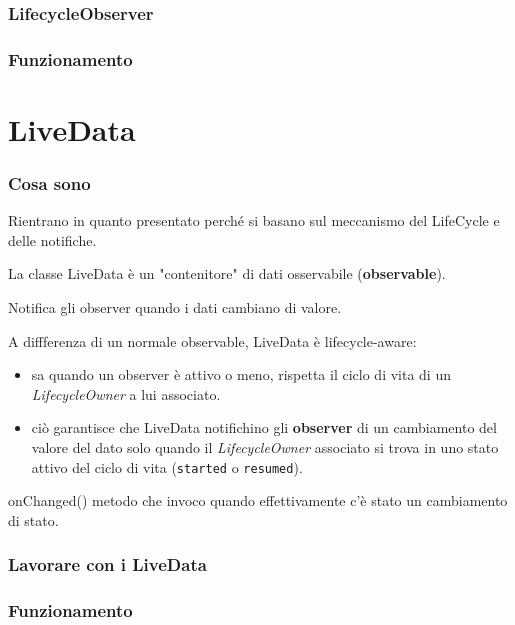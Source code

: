 \subsubsection{LifecycleObserver}

\subsubsection{Funzionamento}

\section{LiveData}
\subsubsection{Cosa sono}
\par Rientrano in quanto presentato perché si basano sul meccanismo del LifeCycle e delle notifiche.
\par La classe LiveData è un "contenitore" di dati osservabile (\textbf{observable}).
\par Notifica gli observer quando i dati cambiano di valore.
\par A diffferenza di un normale observable, LiveData è lifecycle-aware: 
\begin{itemize}
    \item sa quando un observer è attivo o meno, rispetta il ciclo di vita di un \textit{LifecycleOwner} a lui associato.
    \item ciò garantisce che LiveData notifichino gli \textbf{observer} di un cambiamento del valore del dato solo quando il \textit{LifecycleOwner} associato si trova in uno stato attivo del ciclo di vita (\texttt{started} o \texttt{resumed}).
\end{itemize}
\par onChanged() metodo che invoco quando effettivamente c'è stato un cambiamento di stato.

\subsubsection{Lavorare con i LiveData}

\subsubsection{Funzionamento}

